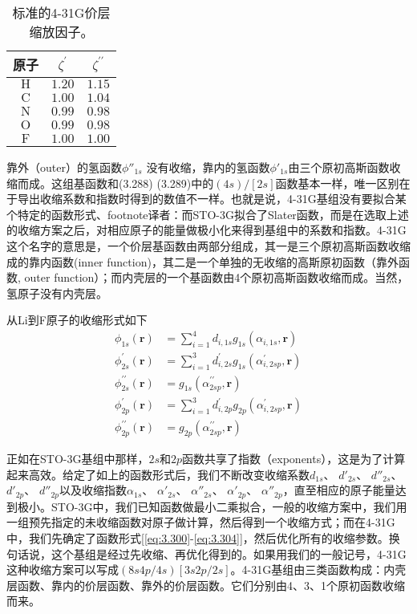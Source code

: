 \begin{table}[]
    \centering
    \begin{tabular}{ccc}
    \toprule 
    原子         & $\zeta^{\prime}$ & $\zeta^{\prime \prime}$ \\
    \midrule 
    $\mathrm{H}$ & $1.20$ & $1.15$ \\
    $\mathrm{C}$ & $1.00$ & $1.04$ \\
    $\mathrm{N}$ & $0.99$ & $0.98$ \\
    $\mathrm{O}$ & $0.99$ & $0.98$ \\
    $\mathrm{F}$ & $1.00$ & $1.00$ \\
    \bottomrule
    \end{tabular}
    \caption{标准的4-31G价层缩放因子。}
    \label{tab:3.9}
\end{table}

靠外（outer）的氢函数$\phi''_{1s}$ 没有收缩，靠内的氢函数$\phi'_{1s}$由三个原初高斯函数收缩而成。这组基函数和(3.288) (3.289)中的$(4s)/[2s]$函数基本一样，唯一区别在于导出收缩系数和指数时得到的数值不一样。也就是说，4-31G基组没有要拟合某个特定的函数形式、footnote{译者：而STO-3G拟合了Slater函数}，而是在选取上述的收缩方案之后，对相应原子的能量做极小化来得到基组中的系数和指数。4-31G这个名字的意思是，一个价层基函数由两部分组成，其一是三个原初高斯函数收缩成的靠内函数(inner function)，其二是一个单独的无收缩的高斯原初函数（靠外函数, outer function）；而内壳层的一个基函数由4个原初高斯函数收缩而成。当然，氢原子没有内壳层。

从Li到F原子的收缩形式如下
\begin{align}
\phi_{1 s}(\mathbf{r}) & = \sum_{i=1}^4 d_{i, 1 s} g_{1 s}\left(\alpha_{i, 1 s}, \mathbf{r}\right) 
\label{eq:3.300}
\\
\phi_{2 s}^{\prime}(\mathbf{r}) & = \sum_{i=1}^3 d_{i, 2 s}^{\prime} g_{1 s}\left(\alpha_{i, 2 s p}^{\prime}, \mathbf{r}\right) \\
\phi_{2 s}^{\prime \prime}(\mathbf{r}) & = g_{1 s}\left(\alpha_{2 s p}^{\prime \prime}, \mathbf{r}\right) \\
\phi_{2 p}^{\prime}(\mathbf{r}) & = \sum_{i=1}^3 d_{i, 2 p}^{\prime} g_{2 p}\left(\alpha_{i, 2 s p}^{\prime}, \mathbf{r}\right) \\
\phi_{2 p}^{\prime \prime}(\mathbf{r}) & = g_{2 p}\left(\alpha_{2 s p}^{\prime \prime}, \mathbf{r}\right)
\label{eq:3.304}
\end{align}

正如在STO-3G基组中那样，$2s$和$2p$函数共享了指数（exponents），这是为了计算起来高效。给定了如上的函数形式后，我们不断改变收缩系数$d_{1s}$、 $d'_{2s}$、 $d''_{2s}$、 $d'_{2p}$、 $d''_{2p}$以及收缩指数$\alpha_{1s}$、 $\alpha'_{2s}$、 $\alpha''_{2s}$、 $\alpha'_{2p}$、 $\alpha''_{2p}$，直至相应的原子能量达到极小。STO-3G中，我们已知函数做最小二乘拟合，一般的收缩方案中，我们用一组预先指定的未收缩函数对原子做计算，然后得到一个收缩方式；而在4-31G中，我们先确定了函数形式[\eqref{eq:3.300}-\eqref{eq:3.304}]，然后优化所有的收缩参数。换句话说，这个基组是经过先收缩、再优化得到的。如果用我们的一般记号，4-31G这种收缩方案可以写成$(8s4p/4s)[3s2p/2s]$。4-31G基组由三类函数构成：内壳层函数、靠内的价层函数、靠外的价层函数。它们分别由4、3、1个原初函数收缩而来。

